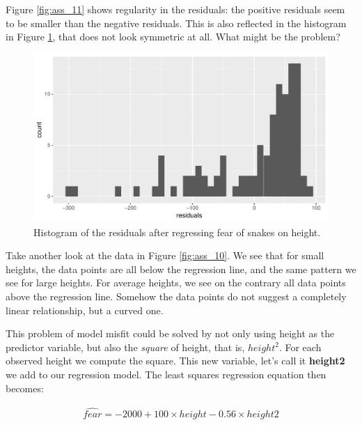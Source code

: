 \documentclass[]{report}\usepackage[]{graphicx}\usepackage[]{color}
\makeatletter
\def\maxwidth{ %
  \ifdim\Gin@nat@width>\linewidth
    \linewidth
  \else
    \Gin@nat@width
  \fi
}
\newenvironment{knitrout}{}{} %
\makeatother
\begin{document}
Figure \ref{fig:ass_11} shows regularity in the residuals: the positive residuals seem to be smaller than the negative residuals. This is also reflected in the histogram in Figure \ref{fig:ass_12}, that does not look symmetric at all. What might be the problem?

\begin{knitrout}
\color{fgcolor}\begin{figure}

{\centering \includegraphics[width=\maxwidth]{figure/ass_12-1} 

}

\caption[Histogram of the residuals after regressing fear of snakes on height]{Histogram of the residuals after regressing fear of snakes on height.}\label{fig:ass_12}
\end{figure}


\end{knitrout}


Take another look at the data in Figure \ref{fig:ass_10}. We see that for small heights, the data points are all below the regression line, and the same pattern we see for large heights. For average heights, we see on the contrary all data points above the regression line. Somehow the data points do not suggest a completely linear relationship, but a curved one. 

This problem of model misfit could be solved by not only using height as the predictor variable, but also the \textit{square} of height, that is, $height^2$. For each observed height we compute the square. This new variable, let's call it \textbf{height2} we add  to our regression model. The least squares regression equation then becomes:

\begin{eqnarray}
\widehat{fear} = -2000 + 100 \times height - 0.56 \times height2 \label{eq:nonlinear}
\end{eqnarray}
\end{document}
